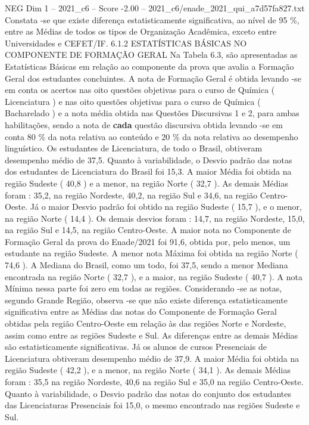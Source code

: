 \begin{textsample}{NEG Dim 1 – 2021\_c6 – Score -2.00 – 2021\_c6/enade\_2021\_qui\_a7d57fa827.txt}
Constata -se que existe diferença estatisticamente significativa, ao nível de 95 \%, entre as Médias de todos os tipos de Organização Acadêmica, exceto entre Universidades e CEFET/IF. 6.1.2 ESTATÍSTICAS BÁSICAS NO COMPONENTE DE FORMAÇÃO GERAL Na Tabela 6.3, são apresentadas as Estatísticas Básicas em relação ao componente da prova que avalia a Formação Geral dos estudantes concluintes.
A nota de Formação Geral é obtida levando -se em conta os acertos nas oito questões objetivas para o curso de Química ( Licenciatura ) e nas oito questões objetivas para o curso de Química ( Bacharelado ) e a nota média obtida nas Questões Discursivas 1 e 2, para ambas habilitações, sendo a nota de \textbf{cada} questão discursiva obtida levando -se em conta 80 \% da nota relativa ao conteúdo e 20 \% da nota relativa ao desempenho linguístico.
Os estudantes de Licenciatura, de todo o Brasil, obtiveram desempenho médio de 37,5.
Quanto à variabilidade, o Desvio padrão das notas dos estudantes de Licenciatura do Brasil foi 15,3.
A maior Média foi obtida na região Sudeste ( 40,8 ) e a menor, na região Norte ( 32,7 ).
As demais Médias foram : 35,2, na região Nordeste, 40,2, na região Sul e 34,6, na região Centro-Oeste.
Já o maior Desvio padrão foi obtido na região Sudeste ( 15,7 ), e o menor, na região Norte ( 14,4 ).
Os demais desvios foram : 14,7, na região Nordeste, 15,0, na região Sul e 14,5, na região Centro-Oeste.
A maior nota no Componente de Formação Geral da prova do Enade/2021 foi 91,6, obtida por, pelo menos, um estudante na região Sudeste.
A menor nota Máxima foi obtida na região Norte ( 74,6 ).
A Mediana do Brasil, como um todo, foi 37,5, sendo a menor Mediana encontrada na região Norte ( 32,7 ), e a maior, na região Sudeste ( 40,7 ).
A nota Mínima nessa parte foi zero em todas as regiões.
Considerando -se as notas, segundo Grande Região, observa -se que não existe diferença estatisticamente significativa entre as Médias das notas do Componente de Formação Geral obtidas pela região Centro-Oeste em relação às das regiões Norte e Nordeste, assim como entre as regiões Sudeste e Sul.
As diferenças entre as demais Médias são estatisticamente significativas.
Já os alunos de cursos Presenciais de Licenciatura obtiveram desempenho médio de 37,9.
A maior Média foi obtida na região Sudeste ( 42,2 ), e a menor, na região Norte ( 34,1 ).
As demais Médias foram : 35,5 na região Nordeste, 40,6 na região Sul e 35,0 na região Centro-Oeste.
Quanto à variabilidade, o Desvio padrão das notas do conjunto dos estudantes das Licenciaturas Presenciais foi 15,0, o mesmo encontrado nas regiões Sudeste e Sul.

\end{textsample}
